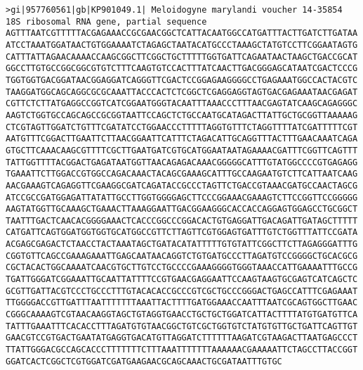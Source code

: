 \documentclass[11pt]{article}
\begin{document}
\begin{Verbatim}[commandchars=\\\{\}]
>gi|957760561|gb|KP901049.1| Meloidogyne marylandi voucher 14-35854 18S ribosomal RNA gene, partial sequence
AGTTTAATCGTTTTTACGAGAAACCGCGAACGGCTCATTACAATGGCCATGATTTACTTGATCTTGATAA
ATCCTAAATGGATAACTGTGGAAAATCTAGAGCTAATACATGCCCTAAAGCTATGTCCTTCGGAATAGTG
CATTTATTAGAACAAAACCAAGCGGCTTCGGCTGCTTTTTGGTGATTCAGAATAACTAAGCTGACCGCAT
GGCCTTGTGCCGGCGGCGTGTCTTTCAAGTGTCCACTTTATCAACTTGACGGGAGCATAATCGACTCCCG
TGGTGGTGACGGATAACGGAGGATCAGGGTTCGACTCCGGAGAAGGGGCCTGAGAAATGGCCACTACGTC
TAAGGATGGCAGCAGGCGCGCAAATTACCCACTCTCGGCTCGAGGAGGTAGTGACGAGAAATAACGAGAT
CGTTCTCTTATGAGGCCGGTCATCGGAATGGGTACAATTTAAACCCTTTAACGAGTATCAAGCAGAGGGC
AAGTCTGGTGCCAGCAGCCGCGGTAATTCCAGCTCTGCCAATGCATAGACTTATTGCTGCGGTTAAAAAG
CTCGTAGTTGGATCTGTTTCGATATCCTGGAACCCTTTTTAGGTGTTTCTAGGTTTTATCGATTTTTCGT
AATGTTTCGGACTTGAATTCTTAACGGAATTCATTTCTAGACATTGCAGGTTTACTTTGAACAAATCAGA
GTGCTTCAAACAAGCGTTTTCGCTTGAATGATCGTGCATGGAATAATAGAAAACGATTTCGGTTCAGTTT
TATTGGTTTTACGGACTGAGATAATGGTTAACAGAGACAAACGGGGGCATTTGTATGGCCCCGTGAGAGG
TGAAATTCTTGGACCGTGGCCAGACAAACTACAGCGAAAGCATTTGCCAAGAATGTCTTCATTAATCAAG
AACGAAAGTCAGAGGTTCGAAGGCGATCAGATACCGCCCTAGTTCTGACCGTAAACGATGCCAACTAGCG
ATCCGCCGATGGAGATTATATTGCCTTGGTGGGGAGCTTCCCGGAAACGAAAGTCTTCCGGTTCCGGGGG
AAGTATGGTTGCAAAGCTGAAACTTAAAGGAATTGACGGAAGGGCACCACCAGGAGTGGAGCCTGCGGCT
TAATTTGACTCAACACGGGGAAACTCACCCGGCCCGGACACTGTGAGGATTGACAGATTGATAGCTTTTT
CATGATTCAGTGGATGGTGGTGCATGGCCGTTCTTAGTTCGTGGAGTGATTTGTCTGGTTTATTCCGATA
ACGAGCGAGACTCTAACCTACTAAATAGCTGATACATATTTTTGTGTATTCGGCTTCTTAGAGGGATTTG
CGGTGTTCAGCCGAAAGAAATTGAGCAATAACAGGTCTGTGATGCCCTTAGATGTCCGGGGCTGCACGCG
CGCTACACTGGCAAAATCAACGTGCTTGTCCTGCCCCGAAAGGGGTGGGTAAACCATTGAAAATTTGCCG
TGATTGGGATCGGAAATTGCAATTATTTTCCGTGAACGAGGAATTCCAAGTAAGTGCGAGTCATCAGCTC
GCGTTGATTACGTCCCTGCCCTTTGTACACACCGCCCGTCGCTGCCCGGGACTGAGCCATTTCGAGAAAT
TTGGGGACCGTTGATTTAATTTTTTTAAATTACTTTTGATGGAAACCAATTTAATCGCAGTGGCTTGAAC
CGGGCAAAAGTCGTAACAAGGTAGCTGTAGGTGAACCTGCTGCTGGATCATTACTTTTATGTGATGTTCA
TATTTGAAATTTCACACCTTTAGATGTGTAACGGCTGTCGCTGGTGTCTATGTGTTGCTGATTCAGTTGT
GAACGTCCGTGACTGAATATGAGGTGACATGTTAGGATCTTTTTTAAGATCGTAAGACTTAATGAGCCCT
TTATTGGGACGCCAGCACCCTTTTTTTCTTTAAATTTTTTTAAAAAACGAAAAATTCTAGCCTTACCGGT
GGATCACTCGGCTCGTGGATCGATGAAGAACGCAGCAAACTGCGATAATTTGTGC


\end{Verbatim}
\end{document}
